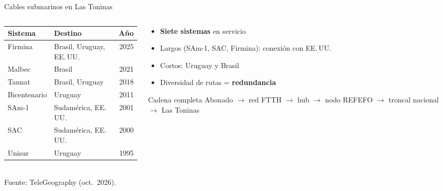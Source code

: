 \begin{frame}{Cables submarinos en Las Toninas}
  \begin{columns}[T]
    \begin{column}{0.56\textwidth}
      \scriptsize
      \begin{tabular}{llr}
        \toprule
        \textbf{Sistema} & \textbf{Destino} & \textbf{Año} \\
        \midrule
        Firmina & Brasil, Uruguay, EE.\,UU. & 2025 \\
        Malbec & Brasil & 2021 \\
        Tannat & Brasil, Uruguay & 2018 \\
        Bicentenario & Uruguay & 2011 \\
        SAm-1 & Sudamérica, EE.\,UU. & 2001 \\
        SAC & Sudamérica, EE.\,UU. & 2000 \\
        Unisur & Uruguay & 1995 \\
        \bottomrule
      \end{tabular}\\[0.1cm]
      Fuente: TeleGeography (oct.\ 2026).
    \end{column}
    \begin{column}{0.44\textwidth}
      \begin{itemize}
        \item \textbf{Siete sistemas} en servicio
        \item Largos (SAm-1, SAC, Firmina): conexión con EE.\,UU.
        \item Cortos: Uruguay y Brasil
        \item Diversidad de rutas = \textbf{redundancia}
      \end{itemize}
      \begin{block}{Cadena completa}
        Abonado $\rightarrow$ red FTTH $\rightarrow$ hub $\rightarrow$ nodo REFEFO $\rightarrow$ troncal nacional $\rightarrow$ Las Toninas
      \end{block}
    \end{column}
  \end{columns}
\end{frame}

